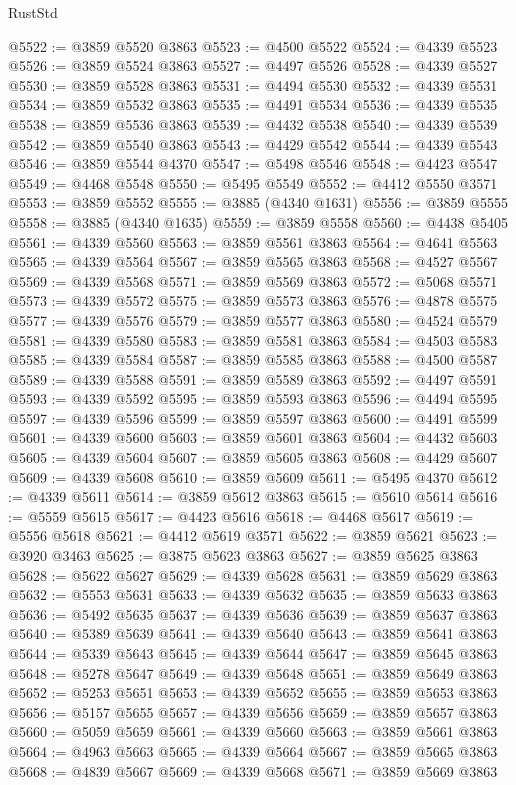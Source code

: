 \begin{lexlean}{RustStd}
\begin{coremodule}
@5522 := @3859 @5520 @3863
@5523 := @4500 @5522
@5524 := @4339 @5523
@5526 := @3859 @5524 @3863
@5527 := @4497 @5526
@5528 := @4339 @5527
@5530 := @3859 @5528 @3863
@5531 := @4494 @5530
@5532 := @4339 @5531
@5534 := @3859 @5532 @3863
@5535 := @4491 @5534
@5536 := @4339 @5535
@5538 := @3859 @5536 @3863
@5539 := @4432 @5538
@5540 := @4339 @5539
@5542 := @3859 @5540 @3863
@5543 := @4429 @5542
@5544 := @4339 @5543
@5546 := @3859 @5544 @4370
@5547 := @5498 @5546
@5548 := @4423 @5547
@5549 := @4468 @5548
@5550 := @5495 @5549
@5552 := @4412 @5550 @3571
@5553 := @3859 @5552
@5555 := @3885 (@4340 @1631)
@5556 := @3859 @5555
@5558 := @3885 (@4340 @1635)
@5559 := @3859 @5558
@5560 := @4438 @5405
@5561 := @4339 @5560
@5563 := @3859 @5561 @3863
@5564 := @4641 @5563
@5565 := @4339 @5564
@5567 := @3859 @5565 @3863
@5568 := @4527 @5567
@5569 := @4339 @5568
@5571 := @3859 @5569 @3863
@5572 := @5068 @5571
@5573 := @4339 @5572
@5575 := @3859 @5573 @3863
@5576 := @4878 @5575
@5577 := @4339 @5576
@5579 := @3859 @5577 @3863
@5580 := @4524 @5579
@5581 := @4339 @5580
@5583 := @3859 @5581 @3863
@5584 := @4503 @5583
@5585 := @4339 @5584
@5587 := @3859 @5585 @3863
@5588 := @4500 @5587
@5589 := @4339 @5588
@5591 := @3859 @5589 @3863
@5592 := @4497 @5591
@5593 := @4339 @5592
@5595 := @3859 @5593 @3863
@5596 := @4494 @5595
@5597 := @4339 @5596
@5599 := @3859 @5597 @3863
@5600 := @4491 @5599
@5601 := @4339 @5600
@5603 := @3859 @5601 @3863
@5604 := @4432 @5603
@5605 := @4339 @5604
@5607 := @3859 @5605 @3863
@5608 := @4429 @5607
@5609 := @4339 @5608
@5610 := @3859 @5609
@5611 := @5495 @4370
@5612 := @4339 @5611
@5614 := @3859 @5612 @3863
@5615 := @5610 @5614
@5616 := @5559 @5615
@5617 := @4423 @5616
@5618 := @4468 @5617
@5619 := @5556 @5618
@5621 := @4412 @5619 @3571
@5622 := @3859 @5621
@5623 := @3920 @3463
@5625 := @3875 @5623 @3863
@5627 := @3859 @5625 @3863
@5628 := @5622 @5627
@5629 := @4339 @5628
@5631 := @3859 @5629 @3863
@5632 := @5553 @5631
@5633 := @4339 @5632
@5635 := @3859 @5633 @3863
@5636 := @5492 @5635
@5637 := @4339 @5636
@5639 := @3859 @5637 @3863
@5640 := @5389 @5639
@5641 := @4339 @5640
@5643 := @3859 @5641 @3863
@5644 := @5339 @5643
@5645 := @4339 @5644
@5647 := @3859 @5645 @3863
@5648 := @5278 @5647
@5649 := @4339 @5648
@5651 := @3859 @5649 @3863
@5652 := @5253 @5651
@5653 := @4339 @5652
@5655 := @3859 @5653 @3863
@5656 := @5157 @5655
@5657 := @4339 @5656
@5659 := @3859 @5657 @3863
@5660 := @5059 @5659
@5661 := @4339 @5660
@5663 := @3859 @5661 @3863
@5664 := @4963 @5663
@5665 := @4339 @5664
@5667 := @3859 @5665 @3863
@5668 := @4839 @5667
@5669 := @4339 @5668
@5671 := @3859 @5669 @3863

\end{coremodule}
\end{lexlean}
